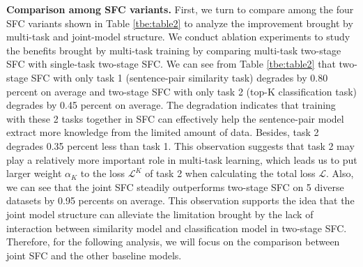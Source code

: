 \documentclass[letterpaper]{article} %
\begin{document}
  \textbf{Comparison  among  SFC  variants.} First, we turn to compare among the
  four  SFC  variants shown in Table \ref{tbe:table2} to analyze the improvement
  brought  by  multi-task  and  joint-model  structure. We conduct
  ablation  experiments  to study the benefits brought by multi-task training by
  comparing multi-task two-stage SFC with single-task two-stage SFC. We can see from
  Table  \ref{tbe:table2}  that  two-stage  SFC  with  only  task 1 (sentence-pair
  similarity task) degrades by 0.80 percent on average and two-stage SFC with only
  task  2  (top-K  classification  task) degrades by 0.45 percent on average. The
  degradation  indicates  that  training  with these 2 tasks together in SFC can
  effectively  help  the  sentence-pair  model  extract  more knowledge from the
  limited  amount  of data. Besides, task 2 degrades 0.35 percent less than task
  1.  This observation suggests that task 2 may play a relatively more important
  role  in multi-task learning, which leads us to put larger weight $\alpha_{K}$
  to  the  loss  $\mathcal{L}^{K}$  of  task  2  when calculating the total loss
  $\mathcal{L}$.  Also, we can see that the joint SFC steadily outperforms
  two-stage  SFC  on  5  diverse  datasets  by  0.95  percents  on  average.  This
  observation  supports  the idea that the joint model structure can
  alleviate the limitation brought by the lack of interaction between similarity
  model  and  classification  model in two-stage SFC. Therefore, for the following
  analysis,  we  will  focus  on  the comparison between joint SFC and the
  other baseline models.
\end{document}

